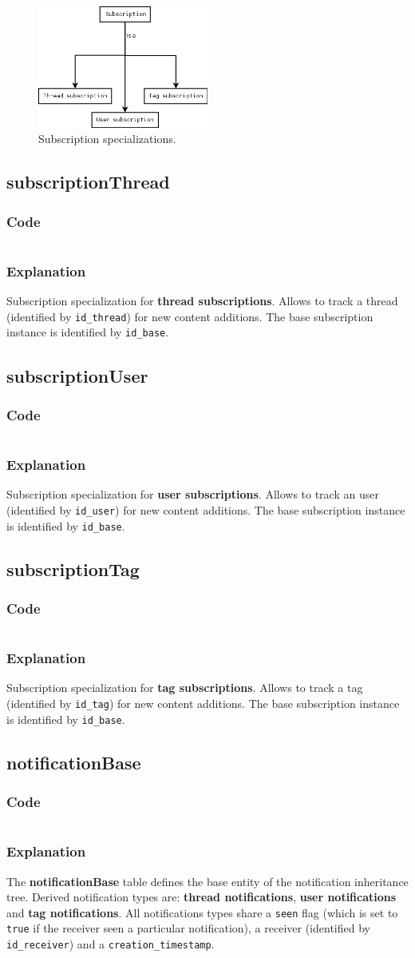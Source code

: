 \documentclass[12pt]{report}
\renewcommand\emph{\textbf}
\newcommand{\printSQLtest}[1]
{
    \inputminted[linenos, breaklines, breakbytoken, tabsize=4, fontsize=\footnotesize]{mysql}{#1}
}
\newcommand{\printSQLTablepage}[2]
{    
    \subsection{#2}
    \subsubsection{Code}
    \printSQLtest{../sql/parts/#1}
    \subsubsection{Explanation}
}
\begin{document}
                    \begin{figure}[!htb]
                    \caption{Subscription specializations.}
                    \centering
                    \includegraphics[width=0.5\textwidth]{td/11subscriptionbase}
                    \end{figure}

                \newpage

                \printSQLTablepage{12_tblSubscriptionThread.sql}{subscriptionThread}
                    Subscription specialization for \emph{thread subscriptions}. Allows to track a thread (identified by \texttt{id_thread}) for new content additions.
                    The base subscription instance is identified by \texttt{id_base}.

                \newpage

                \printSQLTablepage{13_tblSubscriptionUser.sql}{subscriptionUser}
                    Subscription specialization for \emph{user subscriptions}. Allows to track an user (identified by \texttt{id_user}) for new content additions.
                    The base subscription instance is identified by \texttt{id_base}.

                \newpage

                \printSQLTablepage{14_tblSubscriptionTag.sql}{subscriptionTag}
                    Subscription specialization for \emph{tag subscriptions}. Allows to track a tag (identified by \texttt{id_tag}) for new content additions.
                    The base subscription instance is identified by \texttt{id_base}.

                \newpage

                \printSQLTablepage{15_tblNotificationBase.sql}{notificationBase}
                    The \emph{notificationBase} table defines the base entity of the notification inheritance tree. Derived notification types are: \emph{thread notifications}, \emph{user notifications} and \emph{tag notifications}.
                    All notifications types share a \texttt{seen} flag (which is set to \texttt{true} if the receiver seen a particular notification), a receiver (identified by \texttt{id_receiver}) and a \texttt{creation_timestamp}.
\end{document}
